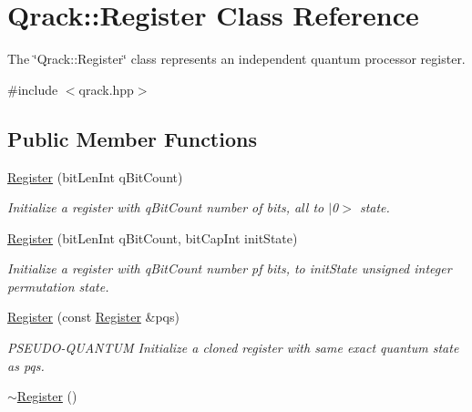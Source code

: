 \hypertarget{classQrack_1_1Register}{}\section{Qrack\+:\+:Register Class Reference}
\label{classQrack_1_1Register}


The \char`\"{}\+Qrack\+::\+Register\char`\"{} class represents an independent quantum processor register.  




{\ttfamily \#include $<$qrack.\+hpp$>$}

\subsection*{Public Member Functions}
\begin{DoxyCompactItemize}
\item 
\hyperlink{classQrack_1_1Register_ad4327f36e284b98649241ac485240673}{Register} (bit\+Len\+Int q\+Bit\+Count)\hypertarget{classQrack_1_1Register_ad4327f36e284b98649241ac485240673}{}\label{classQrack_1_1Register_ad4327f36e284b98649241ac485240673}

\begin{DoxyCompactList}\small\item\em Initialize a register with q\+Bit\+Count number of bits, all to $\vert$0$>$ state. \end{DoxyCompactList}\item 
\hyperlink{classQrack_1_1Register_abc21b5f8713919081796bb485229d8b7}{Register} (bit\+Len\+Int q\+Bit\+Count, bit\+Cap\+Int init\+State)\hypertarget{classQrack_1_1Register_abc21b5f8713919081796bb485229d8b7}{}\label{classQrack_1_1Register_abc21b5f8713919081796bb485229d8b7}

\begin{DoxyCompactList}\small\item\em Initialize a register with q\+Bit\+Count number pf bits, to init\+State unsigned integer permutation state. \end{DoxyCompactList}\item 
\hyperlink{classQrack_1_1Register_acd993a721794cc3e081ea907a9b8847f}{Register} (const \hyperlink{classQrack_1_1Register}{Register} \&pqs)\hypertarget{classQrack_1_1Register_acd993a721794cc3e081ea907a9b8847f}{}\label{classQrack_1_1Register_acd993a721794cc3e081ea907a9b8847f}

\begin{DoxyCompactList}\small\item\em P\+S\+E\+U\+D\+O-\/\+Q\+U\+A\+N\+T\+UM Initialize a cloned register with same exact quantum state as pqs. \end{DoxyCompactList}\item 
\hyperlink{classQrack_1_1Register_afb95c6368320c2ecd6499ff3a3a5aab7}{$\sim$\+Register} ()\hypertarget{classQrack_1_1Register_afb95c6368320c2ecd6499ff3a3a5aab7}{}\label{classQrack_1_1Register_afb95c6368320c2ecd6499ff3a3a5aab7}


\end{DoxyCompactItemize}
